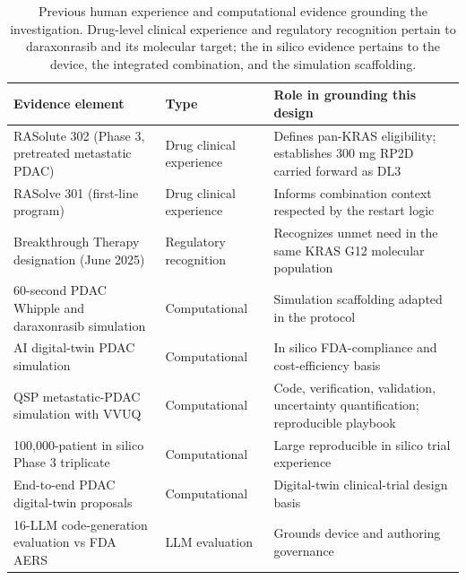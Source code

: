 \begin{table}[t]
\caption{Previous human experience and computational evidence grounding the
investigation. Drug-level clinical experience and regulatory recognition pertain to
daraxonrasib and its molecular target; the in silico evidence pertains to the
device, the integrated combination, and the simulation scaffolding.}
\label{tab:sec02-evidence}
\centering
\begin{tabularx}{\textwidth}{L{5cm} L{3.0cm} Y}
\toprule
\textbf{Evidence element} & \textbf{Type} & \textbf{Role in grounding this design} \\
\midrule
RASolute 302 (Phase 3, pretreated metastatic PDAC) & Drug clinical experience & Defines pan-KRAS eligibility; establishes 300 mg RP2D carried forward as DL3 \\
RASolve 301 (first-line program) & Drug clinical experience & Informs combination context respected by the restart logic \\
Breakthrough Therapy designation (June 2025) & Regulatory recognition & Recognizes unmet need in the same KRAS G12 molecular population \\
60-second PDAC Whipple and daraxonrasib simulation & Computational & Simulation scaffolding adapted in the protocol \\
AI digital-twin PDAC simulation \cite{fdadigtwinpc} & Computational & In silico FDA-compliance and cost-efficiency basis \\
QSP metastatic-PDAC simulation with VVUQ \cite{qspmetpancre} & Computational & Code, verification, validation, uncertainty quantification; reproducible playbook \\
100{,}000-patient in silico Phase 3 triplicate \cite{chatgpt100kp} & Computational & Large reproducible in silico trial experience \\
End-to-end PDAC digital-twin proposals \cite{pdacdigtwinp} & Computational & Digital-twin clinical-trial design basis \\
16-LLM code-generation evaluation vs FDA AERS \cite{llmcomp16fda} & LLM evaluation & Grounds device and authoring governance \\
\bottomrule
\end{tabularx}
\end{table}
\vspace*{-1.35cm}

